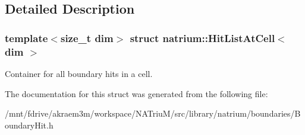 \subsection{Detailed Description}
\subsubsection*{template$<$size\_\-t dim$>$ struct natrium::HitListAtCell$<$ dim $>$}

Container for all boundary hits in a cell. 

The documentation for this struct was generated from the following file:\begin{DoxyCompactItemize}
\item 
/mnt/fdrive/akraem3m/workspace/NATriuM/src/library/natrium/boundaries/BoundaryHit.h\end{DoxyCompactItemize}
